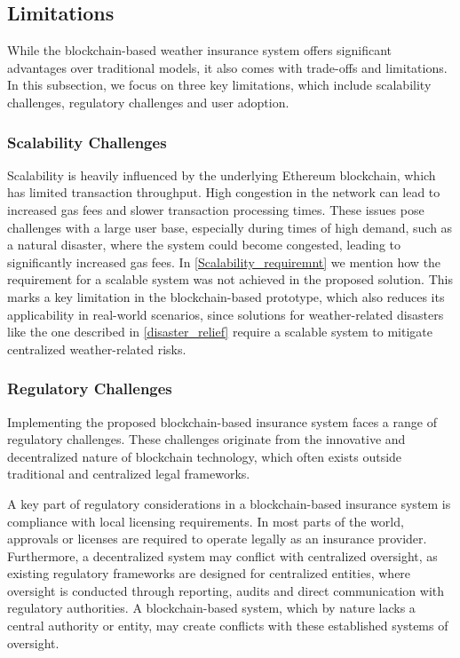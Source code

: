 \subsection{Limitations}\label{analysis_limitations}
While the blockchain-based weather insurance system offers significant advantages over traditional models, it also comes with trade-offs and limitations. In this subsection, we focus on three key limitations, which include scalability challenges, regulatory challenges and user adoption.

\subsubsection{Scalability Challenges}
Scalability is heavily influenced by the underlying Ethereum blockchain, which has limited transaction throughput. High congestion in the network can lead to increased gas fees and slower transaction processing times. These issues pose challenges with a large user base, especially during times of high demand, such as a natural disaster, where the system could become congested, leading to significantly increased gas fees. In \cref{Scalability_requiremnt} we mention how the requirement for a scalable system was not achieved in the proposed solution. This marks a key limitation in the blockchain-based prototype, which also reduces its applicability in real-world scenarios, since solutions for weather-related disasters like the one described in \cref{disaster_relief} require a scalable system to mitigate centralized weather-related risks.

\subsubsection{Regulatory Challenges}
Implementing the proposed blockchain-based insurance system faces a range of regulatory challenges. These challenges originate from the innovative and decentralized nature of blockchain technology, which often exists outside traditional and centralized legal frameworks.

A key part of regulatory considerations in a blockchain-based insurance system is compliance with local licensing requirements. In most parts of the world, approvals or licenses are required to operate legally as an insurance provider. Furthermore, a decentralized system may conflict with centralized oversight, as existing regulatory frameworks are designed for centralized entities, where oversight is conducted through reporting, audits and direct communication with regulatory authorities. A blockchain-based system, which by nature lacks a central authority or entity, may create conflicts with these established systems of oversight.

